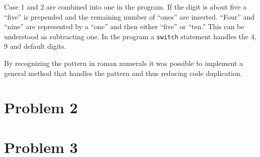 \documentclass{scrartcl}
\newcommand\code[1]{\texttt{#1}}
\begin{document}
Case 1 and 2 are combined into one in the program. If the digit is about five a ``five'' is prepended and the remaining number of ``ones'' are inserted. ``Four'' and ``nine'' are represented by a ``one'' and then either ``five'' or ``ten.'' This can be understood as subtracting one. In the program a \code{switch} statement handles the 4, 9 and default digits.

By recognizing the pattern in roman numerals it was possible to implement a general method that handles the pattern and thus reducing code duplication.

\section*{Problem 2}



\section*{Problem 3}
\end{document}
